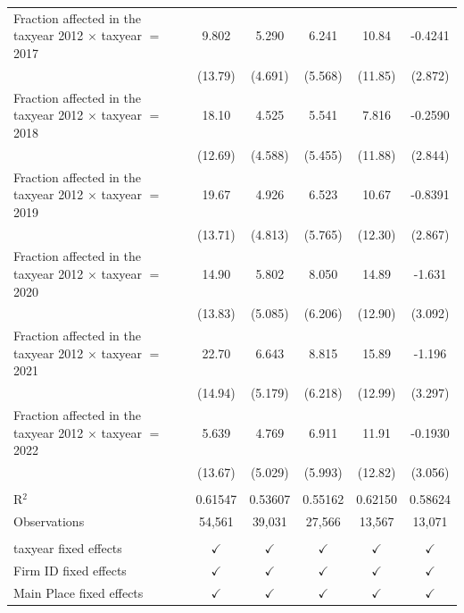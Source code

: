 \begin{tabular}{lccccc}
   Fraction affected in the taxyear 2012 $\times$ taxyear $=$ 2017  & 9.802         & 5.290         & 6.241         & 10.84         & -0.4241\\   
                                                                    & (13.79)       & (4.691)       & (5.568)       & (11.85)       & (2.872)\\   
   Fraction affected in the taxyear 2012 $\times$ taxyear $=$ 2018  & 18.10         & 4.525         & 5.541         & 7.816         & -0.2590\\   
                                                                    & (12.69)       & (4.588)       & (5.455)       & (11.88)       & (2.844)\\   
   Fraction affected in the taxyear 2012 $\times$ taxyear $=$ 2019  & 19.67         & 4.926         & 6.523         & 10.67         & -0.8391\\   
                                                                    & (13.71)       & (4.813)       & (5.765)       & (12.30)       & (2.867)\\   
   Fraction affected in the taxyear 2012 $\times$ taxyear $=$ 2020  & 14.90         & 5.802         & 8.050         & 14.89         & -1.631\\   
                                                                    & (13.83)       & (5.085)       & (6.206)       & (12.90)       & (3.092)\\   
   Fraction affected in the taxyear 2012 $\times$ taxyear $=$ 2021  & 22.70         & 6.643         & 8.815         & 15.89         & -1.196\\   
                                                                    & (14.94)       & (5.179)       & (6.218)       & (12.99)       & (3.297)\\   
   Fraction affected in the taxyear 2012 $\times$ taxyear $=$ 2022  & 5.639         & 4.769         & 6.911         & 11.91         & -0.1930\\   
                                                                    & (13.67)       & (5.029)       & (5.993)       & (12.82)       & (3.056)\\   
    \\
   R$^2$                                                            & 0.61547       & 0.53607       & 0.55162       & 0.62150       & 0.58624\\  
   Observations                                                     & 54,561        & 39,031        & 27,566        & 13,567        & 13,071\\  
    \\
   taxyear fixed effects                                            & $\checkmark$  & $\checkmark$  & $\checkmark$  & $\checkmark$  & $\checkmark$\\   
   Firm ID fixed effects                                            & $\checkmark$  & $\checkmark$  & $\checkmark$  & $\checkmark$  & $\checkmark$\\   
   Main Place fixed effects                                         & $\checkmark$  & $\checkmark$  & $\checkmark$  & $\checkmark$  & $\checkmark$\\   
   \bottomrule
\end{tabular}
\par\endgroup
